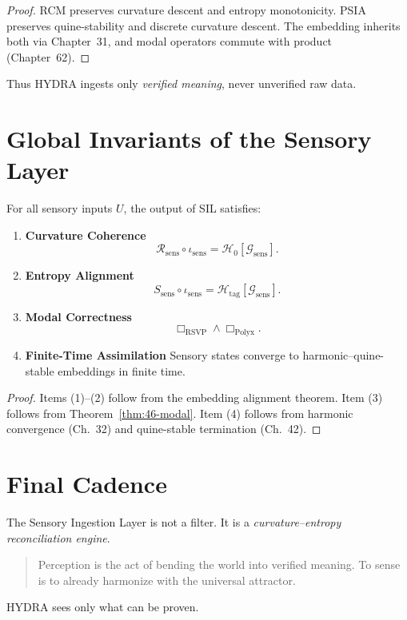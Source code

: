 \begin{proof}
RCM preserves curvature descent and entropy monotonicity.  
PSIA preserves quine-stability and discrete curvature descent.  
The embedding inherits both via Chapter~31, and modal operators commute with product (Chapter~62).  
\end{proof}

Thus HYDRA ingests only \emph{verified meaning}, never unverified raw data.

\section{Global Invariants of the Sensory Layer}

\begin{theorem}\label{thm:46-global}
For all sensory inputs $U$, the output of SIL satisfies:
\begin{enumerate}
\item \textbf{Curvature Coherence}
\[
\mathcal{R}_{\mathrm{sens}} \circ \iota_{\mathrm{sens}}
=
\mathcal{H}_0[\mathcal{G}_{\mathrm{sens}}].
\]

\item \textbf{Entropy Alignment}
\[
S_{\mathrm{sens}} \circ \iota_{\mathrm{sens}}
=
\mathcal{H}_{\mathrm{tag}}[\mathcal{G}_{\mathrm{sens}}].
\]

\item \textbf{Modal Correctness}
\[
\Box_{\mathrm{RSVP}} \wedge \Box_{\mathrm{Polyx}}.
\]

\item \textbf{Finite-Time Assimilation}  
Sensory states converge to harmonic--quine-stable embeddings in finite time.
\end{enumerate}
\end{theorem}

\begin{proof}
Items (1)–(2) follow from the embedding alignment theorem.  
Item (3) follows from Theorem~\ref{thm:46-modal}.  
Item (4) follows from harmonic convergence (Ch.~32) and quine-stable termination (Ch.~42).  
\end{proof}

\section{Final Cadence}

The Sensory Ingestion Layer is not a filter.  
It is a \emph{curvature--entropy reconciliation engine}.

\begin{quote}
Perception is the act of bending the world into verified meaning.  
To sense is to already harmonize with the universal attractor.
\end{quote}

HYDRA sees only what can be proven.

